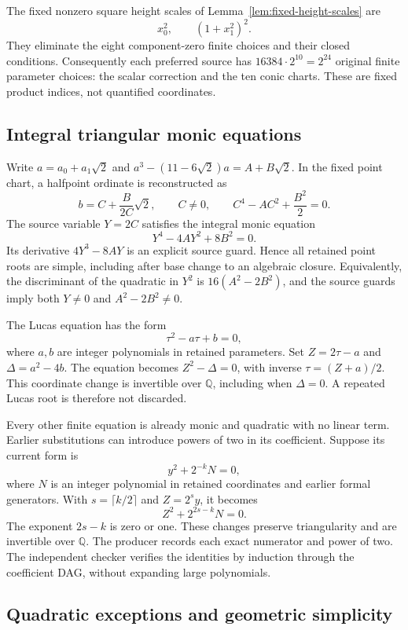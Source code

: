 The fixed nonzero square height scales of
Lemma~\ref{lem:fixed-height-scales} are
\[
                       x_0^2,\qquad (1+x_1^2)^2.
\]
They eliminate the eight component-zero finite choices and their
closed conditions.  Consequently each preferred source has
$16384\cdot2^{10}=2^{24}$ original finite parameter choices:
the scalar correction and the ten conic charts.  These are
fixed product indices, not quantified coordinates.

\subsection{Integral triangular monic equations}

Write $a=a_0+a_1\sqrt2$ and
$a^3-(11-6\sqrt2)a=A+B\sqrt2$.  In the fixed point chart, a
halfpoint ordinate is reconstructed as
\[
 b=C+\frac{B}{2C}\sqrt2,\qquad C\ne0,
 \qquad C^4-AC^2+\frac{B^2}{2}=0.
\]
The source variable $Y=2C$ satisfies the integral monic equation
\[
                         Y^4-4AY^2+8B^2=0.
\]
Its derivative $4Y^3-8AY$ is an explicit source guard.  Hence
all retained point roots are simple, including after base change
to an algebraic closure.  Equivalently, the discriminant of the
quadratic in $Y^2$ is $16(A^2-2B^2)$, and the source guards
imply both $Y\ne0$ and $A^2-2B^2\ne0$.

The Lucas equation has the form
\[
                         \tau^2-a\tau+b=0,
\]
where $a,b$ are integer polynomials in retained parameters.
Set $Z=2\tau-a$ and $\Delta=a^2-4b$.  The equation becomes
$Z^2-\Delta=0$, with inverse $\tau=(Z+a)/2$.  This coordinate
change is invertible over $\mathbb Q$, including when
$\Delta=0$.  A repeated Lucas root is therefore not discarded.

Every other finite equation is already monic and quadratic with
no linear term.  Earlier substitutions can introduce powers of
two in its coefficient.  Suppose its current form is
\[
                          y^2+2^{-k}N=0,
\]
where $N$ is an integer polynomial in retained coordinates and
earlier formal generators.  With $s=\lceil k/2\rceil$ and
$Z=2^s y$, it becomes
\[
                          Z^2+2^{2s-k}N=0.
\]
The exponent $2s-k$ is zero or one.  These changes preserve
triangularity and are invertible over $\mathbb Q$.  The producer
records each exact numerator and power of two.  The independent
checker verifies the identities by induction through the
coefficient DAG, without expanding large polynomials.

\subsection{Quadratic exceptions and geometric simplicity}

